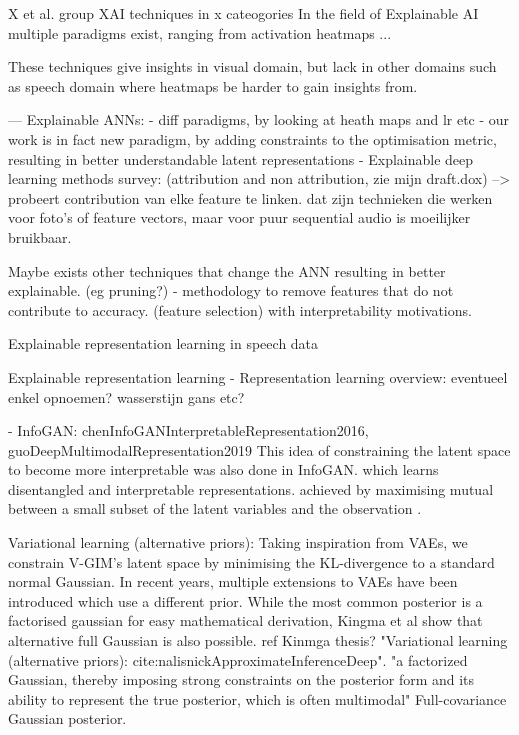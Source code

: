 	
	
	X et al. group XAI techniques in x cateogories
		In the field of Explainable AI multiple paradigms exist, ranging from activation heatmaps ...
	
	These techniques give insights in visual domain, but lack in other domains such as speech domain where heatmaps be harder to gain insights from.

---
Explainable ANNs:
	- diff paradigms, by looking at heath maps and lr etc
	- our work is in fact new paradigm, by adding constraints to the optimisation metric, resulting in better understandable latent representations
	- Explainable deep learning methods survey: \cite{baiExplainableDeepLearning2021} (attribution and non attribution, zie mijn draft.dox) --> probeert contribution van elke feature te linken. dat zijn technieken die werken voor foto's of feature vectors, maar voor puur sequential audio is moeilijker bruikbaar.
	
	Maybe exists other techniques that change the ANN resulting in better explainable. (eg pruning?)
	- methodology to remove features that do not contribute to accuracy. (feature selection) with interpretability motivations. \cite{glorfeldMethodologySimplificationInterpretation1996}
	
	
Explainable representation learning in speech data



Explainable representation learning
	- Representation learning overview: eventueel enkel opnoemen? wasserstijn gans etc?
	
	- InfoGAN: chenInfoGANInterpretableRepresentation2016, guoDeepMultimodalRepresentation2019
		This idea of constraining the latent space to become more interpretable was also done in InfoGAN.
		which learns disentangled and interpretable representations. achieved by maximising mutual between a small subset of the latent variables and the observation \cite{chenInfoGANInterpretableRepresentation2016}.
		

Variational learning (alternative priors):
	Taking inspiration from VAEs, we constrain V-GIM's latent space by minimising the KL-divergence to a standard normal Gaussian. In recent years, multiple extensions to VAEs have been introduced which use a different prior. 
	While the most common posterior is a factorised gaussian for easy mathematical derivation, Kingma et al \cite{kingmaIntroductionVariationalAutoencoders2019} show that alternative full Gaussian is also possible. ref Kinmga thesis? "Variational learning (alternative priors): cite:nalisnickApproximateInferenceDeep". "a factorized Gaussian, thereby imposing strong constraints on the posterior form and its ability to represent the true posterior, which is often multimodal" 
	Full-covariance Gaussian posterior.
	
